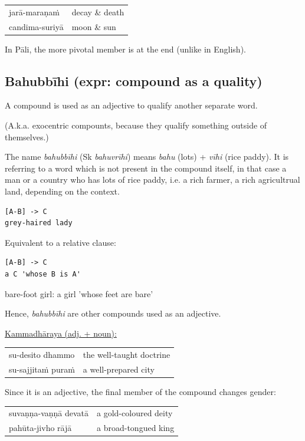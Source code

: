 \documentclass[11pt,oneside]{memoir}
\begin{document}
\begin{center}
\begin{tabular}{ll}
jarā-maraṇaṁ & decay \& death\\
candima-suriyā & moon \& sun\\
\end{tabular}
\end{center}

In Pāli, the more pivotal member is at the end (unlike in English).
\subsection{Bahubbīhi (expr: compound as a quality)}
\label{sec:org06aa22b}

A compound is used as an adjective to qualify another separate word.

(A.k.a. exocentric compounts, because they qualify something outside of themselves.)

The name \emph{bahubbīhi} (Sk \emph{bahuvrīhi}) means \emph{bahu} (lots) + \emph{vīhi} (rice paddy).
It is referring to a word which is not present in the compound itself,
in that case a man or a country who has lots of rice paddy, i.e. a rich farmer,
a rich agricultrual land, depending on the context.

\begin{verbatim}
[A-B] -> C
grey-haired lady
\end{verbatim}


Equivalent to a relative clause:

\begin{verbatim}
[A-B] -> C
a C 'whose B is A'
\end{verbatim}


bare-foot girl: a girl 'whose feet are bare'

Hence, \emph{bahubbīhi} are other compounds used as an adjective.

\uline{Kammadhāraya (adj. + noun):}

\begin{center}
\begin{tabular}{ll}
su-desito dhammo & the well-taught doctrine\\
su-sajjitaṁ puraṁ & a well-prepared city\\
\end{tabular}
\end{center}

Since it is an adjective, the final member of the compound changes gender:

\begin{center}
\begin{tabular}{ll}
suvaṇṇa-vaṇṇā devatā & a gold-coloured deity\\
pahūta-jivho rājā & a broad-tongued king\\
\end{tabular}
\end{center}
\end{document}
